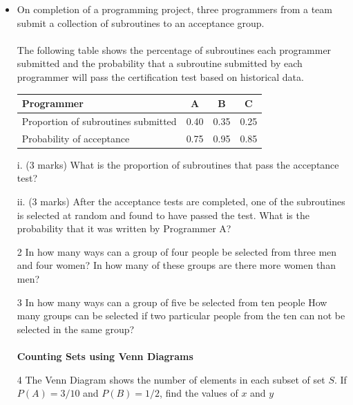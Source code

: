 \documentclass[12pt]{report}
\begin{document}
{\begin{itemize}
	
	
	
	
	\item
	On completion of a programming project, three programmers from a team submit a collection of subroutines to an acceptance group. \\
	\\
	The following table shows the percentage of subroutines each programmer submitted and the probability that a subroutine submitted by each programmer will pass the certification test based on historical data.
	
	\begin{center}
		\begin{tabular}{|l|c|c|c|}
			\hline
			Programmer &	A	&B	& C	\\\hline
			Proportion of subroutines submitted&	0.40	&0.35	&0.25	\\ \hline
			Probability of acceptance	&0.75	&0.95	&0.85\\
			
			\hline
		\end{tabular}
	\end{center}
\end{itemize}
\begin{itemize}
	\item[i.] (3 marks) What is the proportion of subroutines that pass the acceptance test?
	\item[ii.](3 marks)  After the acceptance tests are completed, one of the subroutines is selected at random and found to have passed the test. What is the probability that it was written by Programmer A?
\end{itemize}

\begin{itemize}
	\item[2] In how many ways can a group of four people be selected from three men and four women?
	In how many of these groups are there more women than men?
	\item[3] In how many ways can a group of five be selected from ten people
	How many groups can be selected if two particular people from the ten can not be selected in the same group?\\
	\\
	\textbf{Counting Sets using Venn Diagrams}
	\item[4] 
	The Venn Diagram shows the number of elements in each subset of set $S$.
	If $P(A) = 3/10$ and $P(B) = 1/2$, find the values of $x$ and $y$
	

\end{itemize}}
\end{document}
